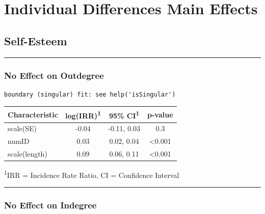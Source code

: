 \documentclass[
  .7em,
  letterpaper,
  DIV=11,
  numbers=noendperiod]{scrartcl}
\begin{document}
\hypertarget{individual-differences-main-effects}{%
\section{Individual Differences Main
Effects}\label{individual-differences-main-effects}}

\hypertarget{self-esteem}{%
\subsection{Self-Esteem}\label{self-esteem}}

\begin{center}\rule{0.5\linewidth}{0.5pt}\end{center}

\hypertarget{no-effect-on-outdegree}{%
\subsubsection{No Effect on Outdegree}\label{no-effect-on-outdegree}}

\begin{verbatim}
boundary (singular) fit: see help('isSingular')
\end{verbatim}

\captionsetup[table]{labelformat=empty,skip=1pt}
\setlength{\LTpost}{0mm}
\begin{longtable}{lccc}
\toprule
\textbf{Characteristic} & \textbf{log(IRR)}\textsuperscript{1} & \textbf{95\% CI}\textsuperscript{1} & \textbf{p-value} \\ 
\midrule
scale(SE) & -0.04 & -0.11, 0.03 & 0.3 \\ 
numID & 0.03 & 0.02, 0.04 & <0.001 \\ 
scale(length) & 0.09 & 0.06, 0.11 & <0.001 \\ 
\bottomrule
\end{longtable}
\begin{minipage}{\linewidth}
\textsuperscript{1}IRR = Incidence Rate Ratio, CI = Confidence Interval\\
\end{minipage}

\begin{center}\rule{0.5\linewidth}{0.5pt}\end{center}

\hypertarget{no-effect-on-indegree}{%
\subsubsection{No Effect on Indegree}\label{no-effect-on-indegree}}
\end{document}
